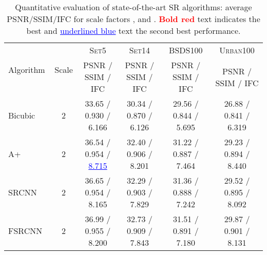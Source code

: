 \documentclass[10pt,twocolumn,letterpaper]{article}
\def\red#1{\textcolor{red}{#1}}
\def\blue#1{\textcolor{blue}{#1}}
\begin{document}
\begin{table*}[t]
\centering
\caption{Quantitative evaluation of state-of-the-art SR algorithms: average PSNR/SSIM/IFC for scale factors ,  and .  \red{\textbf{Bold red}} text indicates the best and \blue{\underline{underlined blue}} text the second best performance.}
\label{tab:quality} 
\begin{tabular}{lccccc}
\hline
\multirow{2}{*}{Algorithm}         & \multirow{2}{*}{Scale} & \textsc{Set5}                                                                  & \textsc{Set14}                                                                 & \textsc{BSDS100}                                                           & \textsc{Urban100}                                                              \\
                                   &                        & PSNR / SSIM / IFC                                                              & PSNR / SSIM / IFC                                                              & PSNR / SSIM / IFC                                                          & PSNR / SSIM / IFC                                                              \\ \hline \hline
Bicubic                            & 2                      & 33.65 / 0.930 / 6.166                                                          & 30.34 / 0.870 / 6.126                                                          & 29.56 / 0.844 / 5.695                                                      & 26.88 / 0.841 / 6.319                                                          \\
A+~\cite{timofte2014a+}            & 2                      & 36.54 / 0.954 / \blue{\underline{8.715}}                                       & 32.40 / 0.906 / 8.201                                                          & 31.22 / 0.887 / 7.464                                                      & 29.23 / 0.894 / 8.440                                                          \\
SRCNN~\cite{dong2014learning}      & 2                      & 36.65 / 0.954 / 8.165                                                          & 32.29 / 0.903 / 7.829                                                          & 31.36 / 0.888 / 7.242                                                      & 29.52 / 0.895 / 8.092                                                          \\
FSRCNN~\cite{dong2016accelerating} & 2                      & 36.99 / 0.955 / 8.200                                                          & 32.73 / 0.909 / 7.843                                                          & 31.51 / 0.891 / 7.180                                                      & 29.87 / 0.901 / 8.131                                                          \\

\end{tabular}
\end{table*}
\end{document}
